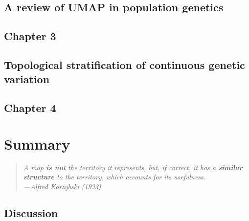\documentclass[12pt, TexShade, letterpaper]{report}
\makeatletter
\newcommand{\unchapter}[1]{%
  \begingroup
  \let\@makechapterhead\@gobble %
  \chapter{#1}
  \endgroup
}
\makeatother
\begin{document}
\begin{refsection}
\unchapter{A review of UMAP in population genetics}
\chapter*{Chapter 3}
\label{chap:chapter3}


\cleardoublepage
{}
\begin{singlespace}
\printbibliography[heading=subbibintoc]
\end{singlespace}
\end{refsection}

\begin{refsection}
\unchapter{Topological stratification of continuous genetic variation}
\chapter*{Chapter 4}
\label{chap:chapter4}


\cleardoublepage
{}
\begin{singlespace}
\printbibliography[heading=subbibintoc]
\end{singlespace}
\end{refsection}

%
%

\part{Summary}
\label{part:conclusion}

\pagebreak
\hspace{0pt}
\vfill

\begin{center}
\begin{quote} 
\begin{singlespace}
\textit{A map \textbf{is not} the territory it represents, but, if correct, it has a \textbf{similar structure} to the territory, which accounts for its usefulness.\\
---Alfred Korzybski (1933)}
\end{singlespace}
\end{quote}
\end{center}

\vfill
\hspace{0pt}
\pagebreak

\unchapter{Discussion}
\end{document}

